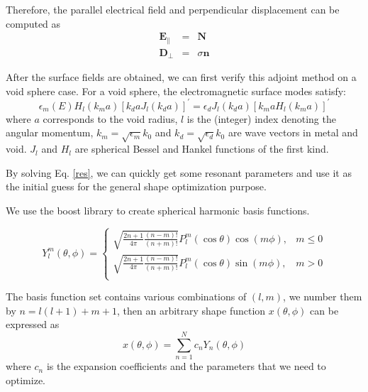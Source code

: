 \documentclass[12pt]{article}
\begin{document}
Therefore, the parallel electrical field and perpendicular displacement can be computed as
\begin{subequations}
\begin{eqnarray}
\mathbf{E}_\parallel &=& \mathbf{N}\\
\mathbf{D}_\perp &=& \sigma\mathbf{n}
\end{eqnarray}
\end{subequations}


After the surface fields are obtained, we can first verify this adjoint method on a void sphere case. For a void sphere, the electromagnetic surface modes satisfy:
\begin{equation}
\epsilon_m (E) H_l(k_ma)[k_daJ_l(k_da)]^\prime = \epsilon_d J_l(k_da)[k_maH_l(k_ma)]^\prime\label{res}
\end{equation}
where $a$ corresponds to the void radius, $l$ is the (integer) index denoting the angular momentum, $k_m=\sqrt{\epsilon_m}k_0$ and $k_d = \sqrt{\epsilon_d}k_0$ are wave vectors in metal and void. $J_l$ and $H_l$ are spherical Bessel and Hankel functions of the first kind\cite{ESM1,ESM2}. 

By solving Eq. \eqref{res}, we can quickly get some resonant parameters and use it as the initial guess for the general shape optimization purpose. %

We use the boost library to create spherical harmonic basis functions. 

\begin{equation}
Y_l^m(\theta,\phi) =\left\{\begin{array}{ll}
\sqrt{\frac{2n+1}{4\pi}\frac{(n-m)!}{(n+m)!}}P_l^m(\cos\theta)\cos(m\phi),&m\leq0\\
\sqrt{\frac{2n+1}{4\pi}\frac{(n-m)!}{(n+m)!}}P_l^m(\cos\theta)\sin(m\phi),&m>0\\\end{array}\right.
\end{equation}

The basis function set contains various combinations of $(l,m)$, we number them by $n=l(l+1)+m+1$, then an arbitrary shape function $x(\theta,\phi)$ can be expressed as 
\begin{equation}
x(\theta,\phi) = \sum_{n=1}^N c_nY_n(\theta,\phi)\label{sh}
\end{equation}
where $c_n$ is the expansion coefficients and the parameters that we need to optimize.
\end{document}

